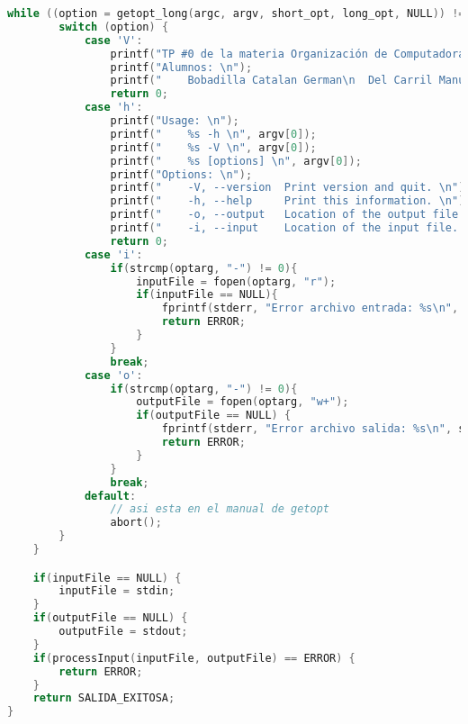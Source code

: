 \documentclass[a4paper]{article}
\begin{document}
\begin{lstlisting}[language=C]
    while ((option = getopt_long(argc, argv, short_opt, long_opt, NULL)) != -1) {
        switch (option) {
            case 'V':
                printf("TP #0 de la materia Organización de Computadoras \n");
                printf("Alumnos: \n");
                printf("	Bobadilla Catalan German\n	Del Carril Manuel \n	Quino Lopez Julian \n");
                return 0;
            case 'h':
                printf("Usage: \n");
                printf("	%s -h \n", argv[0]);
                printf("	%s -V \n", argv[0]);
                printf("	%s [options] \n", argv[0]);
                printf("Options: \n");
                printf("	-V, --version  Print version and quit. \n");
                printf("	-h, --help     Print this information. \n");
                printf("	-o, --output   Location of the output file. \n");
                printf("	-i, --input    Location of the input file. \n");
                return 0;
            case 'i':
            	if(strcmp(optarg, "-") != 0){
            		inputFile = fopen(optarg, "r");
            		if(inputFile == NULL){
            			fprintf(stderr, "Error archivo entrada: %s\n", strerror(errno));
            			return ERROR;
            		}
            	}
                break;
            case 'o':
            	if(strcmp(optarg, "-") != 0){
            		outputFile = fopen(optarg, "w+");
            		if(outputFile == NULL) {
            			fprintf(stderr, "Error archivo salida: %s\n", strerror(errno));
            			return ERROR;
            		}
            	}
                break;
            default:
                // asi esta en el manual de getopt
                abort();
        }
    }

    if(inputFile == NULL) {
        inputFile = stdin;
    }
    if(outputFile == NULL) {
        outputFile = stdout;
    }
    if(processInput(inputFile, outputFile) == ERROR) {
    	return ERROR;
    }
    return SALIDA_EXITOSA;
}

\end{lstlisting}
\end{document}
